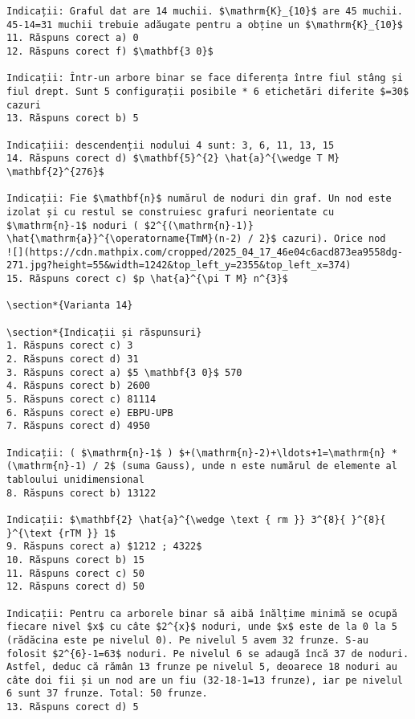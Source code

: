 \begin{verbatim}
Indicații: Graful dat are 14 muchii. $\mathrm{K}_{10}$ are 45 muchii. 45-14=31 muchii trebuie adăugate pentru a obține un $\mathrm{K}_{10}$
11. Răspuns corect a) 0
12. Răspuns corect f) $\mathbf{3 0}$

Indicații: Într-un arbore binar se face diferența între fiul stâng și fiul drept. Sunt 5 configurații posibile * 6 etichetări diferite $=30$ cazuri
13. Răspuns corect b) 5

Indicațiii: descendenții nodului 4 sunt: 3, 6, 11, 13, 15
14. Răspuns corect d) $\mathbf{5}^{2} \hat{a}^{\wedge T M} \mathbf{2}^{276}$

Indicații: Fie $\mathbf{n}$ numărul de noduri din graf. Un nod este izolat și cu restul se construiesc grafuri neorientate cu $\mathrm{n}-1$ noduri ( $2^{(\mathrm{n}-1)} \hat{\mathrm{a}}^{\operatorname{TmM}(n-2) / 2}$ cazuri). Orice nod
![](https://cdn.mathpix.com/cropped/2025_04_17_46e04c6acd873ea9558dg-271.jpg?height=55&width=1242&top_left_y=2355&top_left_x=374)
15. Răspuns corect c) $p \hat{a}^{\pi T M} n^{3}$

\section*{Varianta 14}

\section*{Indicații și răspunsuri}
1. Răspuns corect c) 3
2. Răspuns corect d) 31
3. Răspuns corect a) $5 \mathbf{3 0}$ 570
4. Răspuns corect b) 2600
5. Răspuns corect c) 81114
6. Răspuns corect e) EBPU-UPB
7. Răspuns corect d) 4950

Indicații: ( $\mathrm{n}-1$ ) $+(\mathrm{n}-2)+\ldots+1=\mathrm{n} *(\mathrm{n}-1) / 2$ (suma Gauss), unde n este numărul de elemente al tabloului unidimensional
8. Răspuns corect b) 13122

Indicații: $\mathbf{2} \hat{a}^{\wedge \text { rm }} 3^{8}{ }^{8}{ }^{\text {rTM }} 1$
9. Răspuns corect a) $1212 ; 4322$
10. Răspuns corect b) 15
11. Răspuns corect c) 50
12. Răspuns corect d) 50

Indicații: Pentru ca arborele binar să aibă înălțime minimă se ocupă fiecare nivel $x$ cu câte $2^{x}$ noduri, unde $x$ este de la 0 la 5 (rădăcina este pe nivelul 0). Pe nivelul 5 avem 32 frunze. S-au folosit $2^{6}-1=63$ noduri. Pe nivelul 6 se adaugă încă 37 de noduri. Astfel, deduc că rămân 13 frunze pe nivelul 5, deoarece 18 noduri au câte doi fii și un nod are un fiu (32-18-1=13 frunze), iar pe nivelul 6 sunt 37 frunze. Total: 50 frunze.
13. Răspuns corect d) 5


\end{verbatim}
